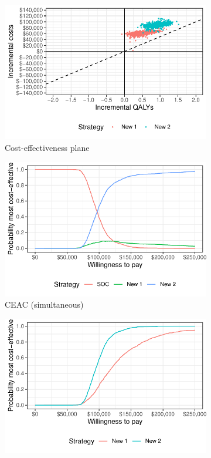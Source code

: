 \documentclass[article, nojss]{jss}\usepackage[]{graphicx}\usepackage[]{color}
\begin{document}
\begin{figure}[t!]
\centering
\begin{subfigure}[b]{.49\textwidth}
\centering
\includegraphics{figure/ce_plane-1.pdf}
\caption{Cost-effectiveness plane} \label{subfig:ce-plane}
\end{subfigure}
\begin{subfigure}[b]{.49\textwidth}
\centering
\includegraphics{figure/ceac-1.pdf}
\caption{CEAC (simultaneous)} \label{subfig:ceac-simultaneous}
\end{subfigure}
\par\bigskip %
\begin{subfigure}[b]{.49\textwidth}
\centering
\includegraphics{figure/ceac-2.pdf}

\end{subfigure}
\end{figure}
\end{document}

